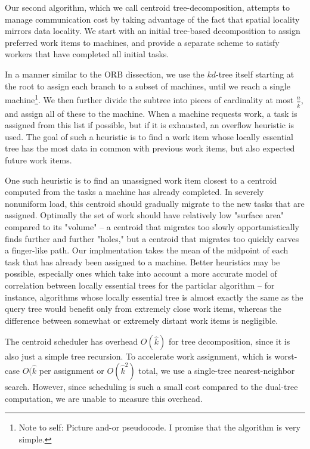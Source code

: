 \documentclass[times, leqno,twocolumn]{article}
\newcommand{\authornote}[1]{\footnote{Note to self: #1}}
\newcommand{\authorsnote}[1]{\authornote{#1}}
\begin{document}
Our second algorithm, which we call centroid tree-decomposition, attempts to manage communication cost by taking advantage of the fact that spatial locality mirrors data locality.
We start with an initial tree-based decomposition to assign preferred work items to machines, and provide a separate scheme to satisfy workers that have completed all initial tasks.

In a manner similar to the ORB dissection, we use the $kd$-tree itself starting at the root to assign each branch to a subset of machines, until we reach a single machine\authorsnote{Picture and-or pseudocode.  I promise that the algorithm is very simple.}.
We then further divide the subtree into pieces of cardinality at most $\frac{n}{\hat{k}}$, and assign all of these to the machine.
When a machine requests work, a task is assigned from this list if possible, but if it is exhausted, an overflow heuristic is used.
The goal of such a heuristic is to find a work item whose locally essential tree has the most data in common with previous work items, but also expected future work items.

One such heuristic is to find an unassigned work item closest to a centroid computed from the tasks a machine has already completed.
In severely nonuniform load, this centroid should gradually migrate to the new tasks that are assigned.
Optimally the set of work should have relatively low "surface area" compared to its "volume" -- a centroid that migrates too slowly opportunistically finds further and further "holes," but a centroid that migrates too quickly carves a finger-like path.
Our implmentation takes the mean of the midpoint of each task that has already been assigned to a machine.
Better heuristics may be possible, especially ones which take into account a more accurate model of correlation between locally essential trees for the particlar algorithm -- for instance, algorithms whose locally essential tree is almost exactly the same as the query tree would benefit only from extremely close work items, whereas the difference between somewhat or extremely distant work items is negligible.

The centroid scheduler has overhead $O(\hat{k})$ for tree decomposition, since it is also just a simple tree recursion.
To accelerate work assignment, which is worst-case $O(\hat{k}$ per assignment or $O(\hat{k}^2)$ total, we use a single-tree nearest-neighbor search.
However, since scheduling is such a small cost compared to the dual-tree computation, we are unable to measure this overhead.
\end{document}
